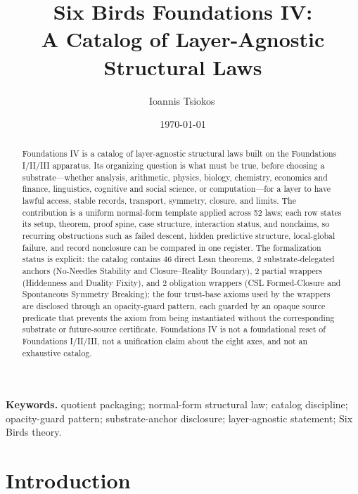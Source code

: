 \documentclass[11pt]{article}
\title{Six Birds Foundations IV:\\
A Catalog of Layer-Agnostic Structural Laws}
\author{Ioannis Tsiokos\,\orcidlink{0009-0009-7659-5964}}
\date{\today}
\theoremstyle{definition}
\begin{document}
\sloppy
{}

\maketitle
\thispagestyle{firstpage}

\begin{abstract}
Foundations IV is a catalog of layer-agnostic structural laws built on
the Foundations I/II/III apparatus. Its organizing question is what
must be true, before choosing a substrate---whether analysis,
arithmetic, physics, biology, chemistry, economics and finance,
linguistics, cognitive and social science, or computation---for a
layer to have lawful access, stable records, transport, symmetry,
closure, and limits.  The contribution is
a uniform normal-form template applied across 52 laws; each row states
its setup, theorem, proof spine, case structure, interaction status,
and nonclaims, so recurring obstructions such as failed descent, hidden
predictive structure, local-global failure, and record nonclosure can
be compared in one register.  The formalization status is explicit: the
catalog contains 46 direct Lean theorems, 2 substrate-delegated anchors
(No-Needles Stability and Closure--Reality Boundary), 2 partial
wrappers (Hiddenness and Duality Fixity), and 2 obligation wrappers
(CSL Formed-Closure and Spontaneous Symmetry Breaking); the four
trust-base axioms used by the wrappers are disclosed through an
opacity-guard pattern, each guarded by an opaque source predicate that
prevents the axiom from being instantiated without the corresponding
substrate or future-source certificate.  Foundations IV is not a
foundational reset of Foundations I/II/III, not a unification claim
about the eight axes, and not an exhaustive catalog.
\end{abstract}

\medskip
\noindent\textbf{Keywords.} quotient packaging; normal-form structural law;
catalog discipline; opacity-guard pattern; substrate-anchor disclosure;
layer-agnostic statement; Six Birds theory.

\section{Introduction}\label{sec:intro}
\end{document}
